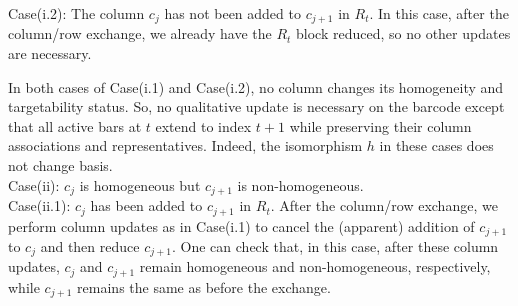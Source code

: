 \documentclass[letterpaper,11pt]{article}
\theoremstyle{plain}
\theoremstyle{definition}
\newcounter{li}
\begin{document}

\noindent Case(i.2): The column $c_j$ has not been added to $c_{j+1}$ in $R_t$. In this case, after the column/row exchange, we already have the $R_t$ block reduced, so no other
updates are necessary.

In both cases of Case(i.1) and Case(i.2), no column
changes its homogeneity and targetability status. So, no qualitative update is necessary on the barcode except that all active bars at $t$ extend to index $t+1$ while preserving their column associations and representatives. Indeed, the isomorphism $h$ in these cases does not change basis.\\

Case(ii): $c_j$ is homogeneous but $c_{j+1}$ is non-homogeneous.\\
Case(ii.1): $c_j$ has been added to $c_{j+1}$ in $R_t$. After the column/row exchange, we perform column updates as in Case(i.1) to cancel the (apparent) addition of
$c_{j+1}$ to $c_j$ and then reduce $c_{j+1}$. One can check that, in this case,
after these column updates, $c_j$ and $c_{j+1}$ remain homogeneous
and non-homogeneous, respectively, while $c_{j+1}$ remains the same as before the exchange.
\end{document}
